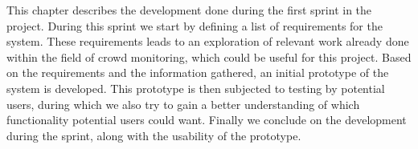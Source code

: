 This chapter describes the development done during the first sprint in the project. During this sprint we start by defining a list of requirements for the system. These requirements leads to an exploration of relevant work already done within the field of crowd monitoring, which could be useful for this project. Based on the requirements and the information gathered, an initial prototype of the system is developed. This prototype is then subjected to testing by potential users, during which we also try to gain a better understanding of which functionality potential users could want. Finally we conclude on the development during the sprint, along with the usability of the prototype.



